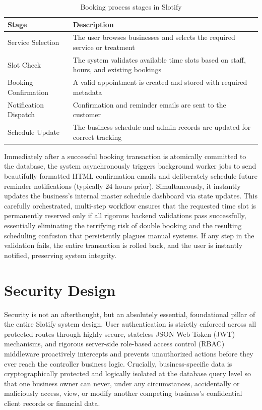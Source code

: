 \begin{table}[h]
\centering
\caption{Booking process stages in Slotify}
\begin{tabular}{|p{4cm}|p{8cm}|}
\hline
\textbf{Stage} & \textbf{Description} \\
\hline
Service Selection & The user browses businesses and selects the required service or treatment \\
\hline
Slot Check & The system validates available time slots based on staff, hours, and existing bookings \\
\hline
Booking Confirmation & A valid appointment is created and stored with required metadata \\
\hline
Notification Dispatch & Confirmation and reminder emails are sent to the customer \\
\hline
Schedule Update & The business schedule and admin records are updated for correct tracking \\
\hline
\end{tabular}
\end{table}

Immediately after a successful booking transaction is atomically committed to the database, the system asynchronously triggers background worker jobs to send beautifully formatted HTML confirmation emails and deliberately schedule future reminder notifications (typically 24 hours prior). Simultaneously, it instantly updates the business's internal master schedule dashboard via state updates. This carefully orchestrated, multi-step workflow ensures that the requested time slot is permanently reserved only if all rigorous backend validations pass successfully, essentially eliminating the terrifying risk of double booking and the resulting scheduling confusion that persistently plagues manual systems. If any step in the validation fails, the entire transaction is rolled back, and the user is instantly notified, preserving system integrity.

\section{Security Design}
Security is not an afterthought, but an absolutely essential, foundational pillar of the entire Slotify system design. User authentication is strictly enforced across all protected routes through highly secure, stateless JSON Web Token (JWT) mechanisms, and rigorous server-side role-based access control (RBAC) middleware proactively intercepts and prevents unauthorized actions before they ever reach the controller business logic. Crucially, business-specific data is cryptographically protected and logically isolated at the database query level so that one business owner can never, under any circumstances, accidentally or maliciously access, view, or modify another competing business's confidential client records or financial data.

